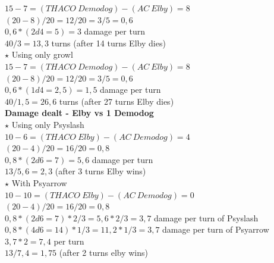 $15-7 = (THACO\:Demodog) - (AC\:Elby) = 8$\\
$(20-8)/20 = 12/20 = 3/5 =  0,6$\\
$0,6 * (2d4 = 5) = 3$ damage per turn\\
$40 / 3 = 13,3$ turns (after 14 turns Elby dies)\\
\newline
$\star$ Using only growl\\
$15-7 = (THACO\:Demodog) - (AC\:Elby) = 8$\\
$(20-8)/20 = 12/20 = 3/5 =  0,6$\\
$0,6 * (1d4 = 2,5) = 1,5$ damage per turn\\
$40 / 1,5 = 26,6$ turns (after 27 turns Elby dies)\\


\textbf{Damage dealt - Elby vs 1 Demodog}\\
\newline
$\star$ Using only Psyslash\\
$10-6 = (THACO\:Elby) - (AC\:Demodog) = 4$\\
$(20-4)/20 = 16/20 = 0,8$\\
$0,8 * (2d6 = 7) = 5,6$ damage per turn\\
$13 / 5,6 = 2,3$ (after 3 turns Elby wins)\\
\newline
$\star$ With Psyarrow\\
$10-10 = (THACO\:Elby) - (AC\:Demodog) = 0$\\
$(20-4)/20 = 16/20 = 0,8$\\
$0,8 * (2d6 = 7) * 2/3  = 5,6 * 2/3 = 3,7$ damage per turn of Psyslash\\
$0,8 * (4d6 = 14) * 1/3 = 11,2 * 1/3 = 3,7$ damage per turn of Psyarrow\\
$3,7 * 2= 7,4$ per turn\\
$13 / 7,4 = 1,75$ (after 2 turns elby wins)\\
\newpage


